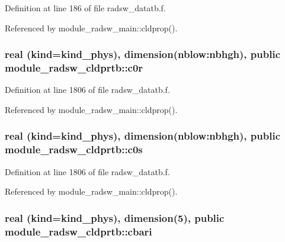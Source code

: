 Definition at line 186 of file radsw\+\_\+datatb.\+f.



Referenced by module\+\_\+radsw\+\_\+main\+::cldprop().

\subsubsection[{\texorpdfstring{c0r}{c0r}}]{\setlength{\rightskip}{0pt plus 5cm}real (kind=kind\+\_\+phys), dimension(nblow\+:nbhgh), public module\+\_\+radsw\+\_\+cldprtb\+::c0r}\hypertarget{namespacemodule__radsw__cldprtb_a8927b6e7cc810301e3843eb0f5c0c795}{}\label{namespacemodule__radsw__cldprtb_a8927b6e7cc810301e3843eb0f5c0c795}


Definition at line 1806 of file radsw\+\_\+datatb.\+f.



Referenced by module\+\_\+radsw\+\_\+main\+::cldprop().

\subsubsection[{\texorpdfstring{c0s}{c0s}}]{\setlength{\rightskip}{0pt plus 5cm}real (kind=kind\+\_\+phys), dimension(nblow\+:nbhgh), public module\+\_\+radsw\+\_\+cldprtb\+::c0s}\hypertarget{namespacemodule__radsw__cldprtb_aab7693c5f31ce2182bca61aff77996bc}{}\label{namespacemodule__radsw__cldprtb_aab7693c5f31ce2182bca61aff77996bc}


Definition at line 1806 of file radsw\+\_\+datatb.\+f.



Referenced by module\+\_\+radsw\+\_\+main\+::cldprop().

\subsubsection[{\texorpdfstring{cbari}{cbari}}]{\setlength{\rightskip}{0pt plus 5cm}real (kind=kind\+\_\+phys), dimension(5), public module\+\_\+radsw\+\_\+cldprtb\+::cbari}\hypertarget{namespacemodule__radsw__cldprtb_ae7f1de5c9736894ac7b54c0e0d312f16}{}\label{namespacemodule__radsw__cldprtb_ae7f1de5c9736894ac7b54c0e0d312f16}


